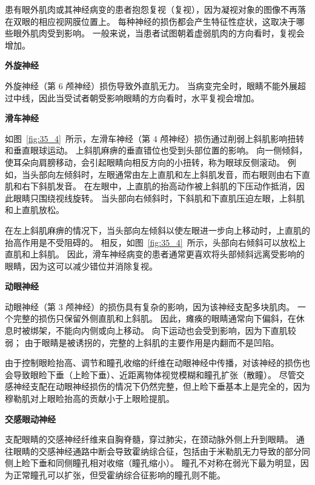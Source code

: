 \begin{proposition}[眼外肌肉或神经损伤] \label{box:35_1}

\quad \quad 患有眼外肌肉或其神经病变的患者抱怨复视（复视），因为凝视对象的图像不再落在双眼的相应视网膜位置上。
每种神经的损伤都会产生特征性症状，这取决于哪些眼外肌肉受到影响。
一般来说，当患者试图朝着虚弱肌肉的方向看时，复视会增加。


\textbf{外旋神经}

\quad \quad 外旋神经（第 6 颅神经）损伤导致外直肌无力。
当病变完全时，眼睛不能外展超过中线，因此当受试者朝受影响眼睛的方向看时，水平复视会增加。


\textbf{滑车神经}

\quad \quad 如图~\ref{fig:35_4}~所示，左滑车神经（第 4 颅神经）损伤通过削弱上斜肌影响扭转和垂直眼球运动。
上斜肌麻痹的垂直错位也受到头部位置的影响。
向一侧倾斜，使耳朵向肩膀移动，会引起眼睛向相反方向的小扭转，称为眼球反侧滚动。
例如，当头部向左倾斜时，左眼通常由左上直肌和左上斜肌发音，而右眼则由右下直肌和右下斜肌发音。
在左眼中，上直肌的抬高动作被上斜肌的下压动作抵消，因此眼睛只围绕视线旋转。
当头部向右倾斜时，下斜肌和下直肌压迫左眼，上斜肌和上直肌放松。


\quad \quad 在左上斜肌麻痹的情况下，当头部向左倾斜以使左眼进一步向上移动时，上直肌的抬高作用是不受阻碍的。
相反，如图~\ref{fig:35_4}~所示，头部向右倾斜可以放松上直肌和上斜肌。
因此，滑车神经病变的患者通常更喜欢将头部倾斜远离受影响的眼睛，因为这可以减少错位并消除复视。


\textbf{动眼神经}

\quad \quad 动眼神经（第 3 颅神经）的损伤具有复杂的影响，因为该神经支配多块肌肉。
一个完整的损伤只保留外侧直肌和上斜肌。
因此，瘫痪的眼睛通常向下偏斜，在休息时被绑架，不能向内侧或向上移动。
向下运动也会受到影响，因为下直肌较弱；
由于眼睛是被诱拐的，完整的上斜肌的主要作用是内翻而不是凹陷。


\quad \quad 由于控制眼睑抬高、调节和瞳孔收缩的纤维在动眼神经中传播，对该神经的损伤也会导致眼睑下垂（上睑下垂）、近距离物体视觉模糊和瞳孔扩张（散瞳）。
尽管交感神经支配在动眼神经损伤的情况下仍然完整，但上睑下垂基本上是完全的，因为穆勒肌对上眼睑抬高的贡献小于上眼睑提肌。


\textbf{交感眼动神经}

\quad \quad 支配眼睛的交感神经纤维来自胸脊髓，穿过肺尖，在颈动脉外侧上升到眼睛。
通往眼睛的交感神经通路中断会导致霍纳综合征，包括由于米勒肌无力导致的部分同侧上睑下垂和同侧瞳孔相对收缩（瞳孔缩小）。
瞳孔不对称在弱光下最为明显，因为正常瞳孔可以扩张，但受霍纳综合征影响的瞳孔则不能。
	
\end{proposition}


